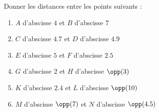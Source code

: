 
\begin{exercice}\label{exo2smath-0047}

    Donner les distances entre les points suivants :
    \begin{enumerate}
        \item
            \( A\) d'abscisse \( 4\) et \( B\) d'abscisse \( 7\)
        \item
            \( C \) d'abscisse \( 4.7\) et \( D\) d'abscisse \( 4.9\)
        \item
            \( E \) d'abscisse \( 5\) et \( F\) d'abscisse \( 2.5\)
        \item
            \( G \) d'abscisse \( 2\) et \( H\) d'abscisse \( \opp(3)\)
        \item
            \( K \) d'abscisse \( 2.4\) et \( L\) d'abscisse \( \opp(10)\)
        \item
            \( M \) d'abscisse \( \opp(7)\) et \( N\) d'abscisse \( \opp(4.5)\)
    \end{enumerate}

\end{exercice}
